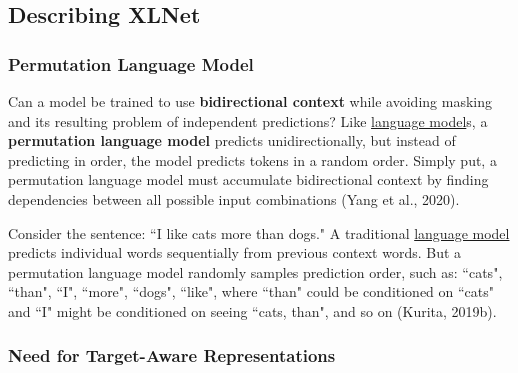 \subsection{Describing XLNet}


\subsubsection{Permutation Language Model} \label{sec:permutationLM}

Can a model be trained to use \textbf{bidirectional context} while avoiding masking and its resulting problem of independent predictions? Like  \hyperref[sec:LanguageModels]{language model}s, a \textbf{permutation language model} predicts unidirectionally, but instead of predicting in order, the model predicts tokens in a random order. Simply put, a permutation language model must accumulate bidirectional context by finding dependencies between all possible input combinations (Yang et al., 2020). 

Consider the sentence: ``I like cats more than dogs." A traditional \hyperref[sec:LanguageModels]{language model} predicts individual words sequentially from previous context words. But a permutation language model randomly samples prediction order, such as: ``cats", ``than", ``I", ``more", ``dogs", ``like", where ``than" could be conditioned on ``cats" and ``I" might be conditioned on seeing ``cats, than", and so on (Kurita, 2019b). 






\subsubsection{Need for Target-Aware Representations}\label{sec:TargetAwarePred}

